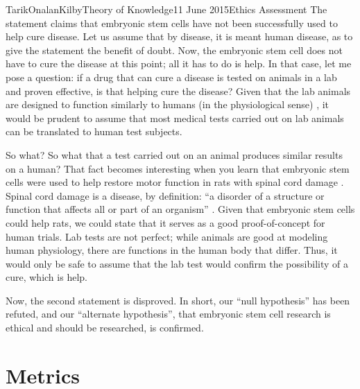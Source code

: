 \documentclass[a4paper,12pt]{article}
\begin{document}
\begin{mla}{Tarik}{Onalan}{Kilby}{Theory of Knowledge}{11 June 2015}{Ethics Assessment}
            The statement claims that embryonic stem cells have not been successfully used to help
            cure disease. Let us assume that by disease, it is meant human disease, as to give the
            statement the benefit of doubt. Now, the embryonic stem cell does not have to cure the
            disease at this point; all it has to do is help. In that case, let me pose a question:
            if a drug that can cure a disease is tested on animals in a lab and proven effective, is
            that helping cure the disease? Given that the lab animals are designed to function similarly
            to humans (in the physiological sense) \autocite{NIH}, it would be prudent to assume that
            most medical tests carried out on lab animals can be translated to human test subjects.

            So what? So what that a test carried out on an animal produces similar results on a human?
            That fact becomes interesting when you learn that embryonic stem cells were used to help
            restore motor function in rats with spinal cord damage \autocite{stem}. Spinal
            cord damage is a disease, by definition: ``a disorder of a structure or function that
            affects all or part of an organism'' \autocite{oxford}. Given that embryonic stem cells
            could help rats, we could state that it serves as a good proof-of-concept for human trials.
            Lab tests are not perfect; while animals are good at modeling human physiology, there are
            functions in the human body that differ. Thus, it would only be safe to assume that the
            lab test would confirm the possibility of a cure, which is help.

            Now, the second statement is disproved. In short, our ``null hypothesis'' has been refuted,
            and our ``alternate hypothesis'', that embryonic stem cell research is ethical and should
            be researched, is confirmed. 
        \section{Metrics}

\end{mla}
\end{document}

